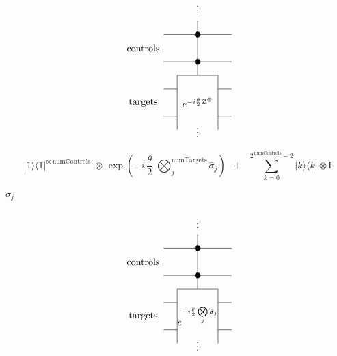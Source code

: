 \documentclass{article}
\begin{document}
\[
             \begin{tikzpicture}[scale=.5]
             \node[draw=none] at (-4, 1) {targets};
             \node[draw=none] at (-4, 5) {controls};
             
             \node[draw=none] at (0, 8) {$\vdots$};
             \draw (0, 7) -- (0, 6);
             
             \draw (-2.5, 6) -- (2.5, 6);
             \draw[fill=black] (0, 6) circle (.2);
             \draw (0, 6) -- (0, 4);         
             
             \draw (-2.5, 4) -- (2.5, 4);
             \draw[fill=black] (0, 4) circle (.2);
             \draw(0, 4) -- (0, 3);

             \draw (-2.5,0) -- (-1.5, 0);
             \draw (1.5, 0) -- (2.5, 0);
             \draw (-2.5,2) -- (-1.5, 2);
             \draw (1.5, 2) -- (2.5, 2);
             \draw (-1.5,-1)--(-1.5,3)--(1.5,3)--(1.5,-1);
             \node[draw=none] at (0, 1) {$e^{-i\frac{\theta}{2}Z^{\otimes}}$};
             \node[draw=none] at (0, -1) {$\vdots$};
             
             \end{tikzpicture}
 \]
\pagebreak

\[ 
   |1\rangle\langle 1|^{\otimes\, \text{numControls}} \; \otimes \,
    \exp \left( - i \, \frac{\theta}{2} \; \bigotimes_{j}^{\text{numTargets}} \hat{\sigma}_j\right)
    \;\;+\;\; \sum\limits_{k=0}^{2^{\,\text{numControls}} - 2} |k\rangle\langle k| \otimes \text{I}
\]
\pagebreak

$\hat{\sigma}_j$
\pagebreak

\[
             \begin{tikzpicture}[scale=.5]
             \node[draw=none] at (-4, 1) {targets};
             \node[draw=none] at (-4, 5) {controls};
             
             \node[draw=none] at (0, 8) {$\vdots$};
             \draw (0, 7) -- (0, 6);
             
             \draw (-2.5, 6) -- (2.5, 6);
             \draw[fill=black] (0, 6) circle (.2);
             \draw (0, 6) -- (0, 4);         
             
             \draw (-2.5, 4) -- (2.5, 4);
             \draw[fill=black] (0, 4) circle (.2);
             \draw(0, 4) -- (0, 3);

             \draw (-2.5,0) -- (-1.5, 0);
             \draw (1.5, 0) -- (2.5, 0);
             \draw (-2.5,2) -- (-1.5, 2);
             \draw (1.5, 2) -- (2.5, 2);
             \draw (-1.5,-1)--(-1.5,3)--(1.5,3)--(1.5,-1);
             \node[draw=none] at (0, 1) {$e^{-i\frac{\theta}{2} \bigotimes\limits_j \hat{\sigma}_j }$};
             \node[draw=none] at (0, -1) {$\vdots$};
             
             \end{tikzpicture}
 \]
\pagebreak
\end{document}
